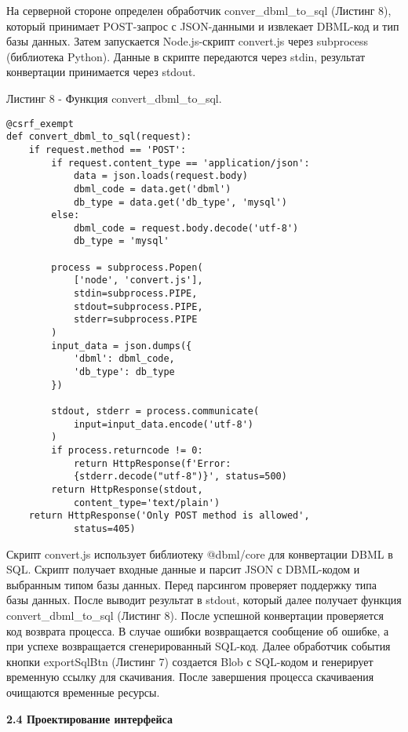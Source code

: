 На серверной стороне определен обработчик conver\_dbml\_to\_sql (Листинг 8), который принимает POST-запрос с JSON-данными и извлекает DBML-код и тип базы данных. Затем запускается Node.js-скрипт convert.js через subprocess (библиотека Python). Данные в скрипте передаются через stdin, результат конвертации принимается через stdout.

Листинг 8 - Функция convert\_dbml\_to\_sql.
\begin{lstlisting}[frame=single]
@csrf_exempt
def convert_dbml_to_sql(request):
    if request.method == 'POST':
        if request.content_type == 'application/json':
            data = json.loads(request.body)
            dbml_code = data.get('dbml')
            db_type = data.get('db_type', 'mysql')
        else:
            dbml_code = request.body.decode('utf-8')
            db_type = 'mysql'

        process = subprocess.Popen(
            ['node', 'convert.js'],
            stdin=subprocess.PIPE,
            stdout=subprocess.PIPE,
            stderr=subprocess.PIPE
        )
        input_data = json.dumps({
            'dbml': dbml_code,
            'db_type': db_type
        })

        stdout, stderr = process.communicate(
            input=input_data.encode('utf-8')
        )
        if process.returncode != 0:
            return HttpResponse(f'Error: 
            {stderr.decode("utf-8")}', status=500)
        return HttpResponse(stdout, 
            content_type='text/plain')
    return HttpResponse('Only POST method is allowed', 
            status=405)
\end{lstlisting}

Скрипт convert.js использует библиотеку @dbml/core для конвертации 
DBML в SQL. Скрипт получает входные данные и парсит JSON с DBML-кодом и выбранным типом базы данных. Перед парсингом проверяет поддержку типа базы данных. После выводит результат в stdout, который далее получает функция convert\_dbml\_to\_sql (Листинг 8). После успешной конвертации проверяется код возврата процесса. В случае ошибки возвращается сообщение об ошибке, а при успехе возвращается сгенерированный SQL-код. Далее обработчик события кнопки exportSqlBtn (Листинг 7) создается Blob с SQL-кодом и генерирует временную ссылку для скачивания. После завершения процесса скачиваения очищаются временные ресурсы.


\newpage
\textbf{2.4 Проектирование интерфейса}

